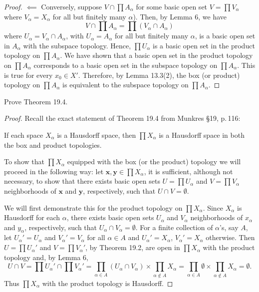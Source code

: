 \begin{proof}
$\impliedby$ Conversely, suppose $V\cap\prod A_\alpha$ for some
basic open set $V=\prod V_\alpha$ where $V_\alpha=X_\alpha$ for
all but finitely many $\alpha$). Then, by Lemma 6, we have
\[
V\cap\prod A_\alpha=\prod\left(V_\alpha\cap A_\alpha\right)
\]
where $U_\alpha=V_\alpha\cap A_\alpha$, with $U_\alpha=A_\alpha$
for all but finitely many $\alpha$, is a basic open set in
$A_\alpha$ with the subspace topology. Hence, $\prod U_\alpha$ is
a basic open set in the product topology on $\prod A_\alpha$. We
have shown that a basic open set in the product topology on
$\prod A_\alpha$ corresponds to a basic open set in the subspace
topology on $\prod A_\alpha$. This is true for every $x_0\in
X'$. Therefore, by Lemma 13.3(2), the box (or product) topology
on $\prod A_\alpha$ is equivalent to the subspace topology on
$\prod A_\alpha$.
\end{proof}
\newpage
\begin{problem}[Munkres \S19, p.\,118, \#3]
Prove Theorem 19.4.
\end{problem}
\begin{proof}
Recall the exact statement of Theorem 19.4 from Munkres \S19,
p.\,116:
\begin{theorem*}
If each space $X_\alpha$ is a Hausdorff space, then $\prod
X_\alpha$ is a Hausdorff space in both the box and product
topologies.
\end{theorem*}
To show that $\prod X_\alpha$ equipped with the box (or the
product) topology we will proceed in the following way: let
$\mathbf{x},\mathbf{y}\in\prod X_\alpha$, it is sufficient,
although not necessary, to show that there exists basic open sets
$U=\prod U_\alpha$ and $V=\prod V_\alpha$ neighborhoods of
$\mathbf{x}$ and $\mathbf{y}$, respectively, such that $U\cap
V=\emptyset$.

We will first demonstrate this for the product topology on $\prod
X_\alpha$. Since $X_\alpha$ is Hausdorff for each $\alpha$, there
exists basic open sets $U_\alpha$ and $V_\alpha$ neighborhoods of
$x_\alpha$ and $y_\alpha$, respectively, such that $U_\alpha\cap
V_\alpha=\emptyset$. For a finite collection of $\alpha$'s, say
$A$, let $U_\alpha'=U_\alpha$ and $V_\alpha'=V_\alpha$ for all
$\alpha\in A$ and $U_\alpha'=X_\alpha$, $V_\alpha'=X_\alpha$
otherwise. Then $U=\prod U_\alpha'$ and $V=\prod V_\alpha'$, by
Theorem 19.2, are open in $\prod X_\alpha$ with the product
topology and, by Lemma 6,
\[
U\cap V=\prod U_\alpha'\cap \prod V_\alpha'
=\prod_{\alpha\in A}\left(U_\alpha\cap
  V_\alpha\right)\times\prod_{\alpha\notin A}X_\alpha
=\prod_{\alpha\in A}\emptyset\times\prod_{\alpha\notin A}X_\alpha
=\emptyset.
\]
Thus $\prod X_\alpha$ with the product topology is Hausdorff.
\end{proof}
